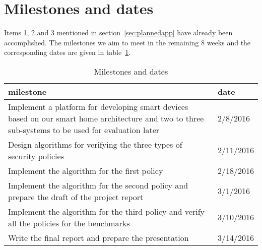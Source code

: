 \documentclass{article}
\begin{document}
\section{Milestones and dates}
Items 1, 2 and 3 mentioned in section~\ref{sec:plannedapp} have already been accomplished. 
The milestones we aim to meet in the remaining 8 weeks and the corresponding dates are given in table~\ref{table:milestone}.
\begin{table}[h]
\begin{center}
\begin{tabular}{|p{5cm}|p{2cm}|}
\hline 
milestone & date \\ \hline
Implement a platform for developing smart devices based on our smart home architecture and  two to three sub-systems to be used for evaluation later & 2/8/2016 \\\hline
Design algorithms for verifying the three types of security policies & 2/11/2016 \\\hline
Implement the algorithm for the first policy & 2/18/2016 \\\hline
Implement the algorithm for the second policy and prepare the draft of the project report & 3/1/2016  \\\hline
Implement the algorithm for the third policy and verify all the policies for the benchmarks & 3/10/2016 \\\hline
Write the final report and prepare the presentation & 3/14/2016 \\\hline
\end{tabular}
\end{center}
\caption{Milestones and dates}
\label{table:milestone}
\end{table}




\end{document}
